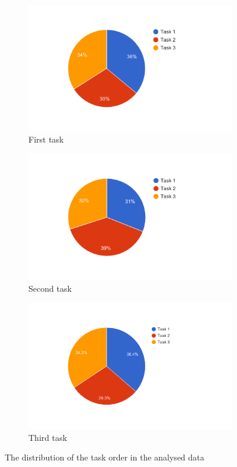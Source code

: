 \begin{figure}[H]
	\centering
	\begin{subfigure}[b]{0.32\textwidth}
		\centering
		\includegraphics[width=\linewidth]{fig/firsttask}
		\caption{First task}
		\label{fig:firsttask}
	\end{subfigure}
	\begin{subfigure}[b]{0.32\textwidth}
		\centering
		\includegraphics[width=\linewidth]{fig/secondtask}
		\caption{Second task}
		\label{fig:secondtask}
	\end{subfigure}
	\begin{subfigure}[b]{0.32\textwidth}
		\centering
		\includegraphics[width=\linewidth]{fig/thirdtask}
		\caption{Third task}
		\label{fig:thirdtask}
	\end{subfigure}
	\caption{The distribution of the task order in the analysed data}
	\label{fig:taskorderdistribution}
\end{figure}


